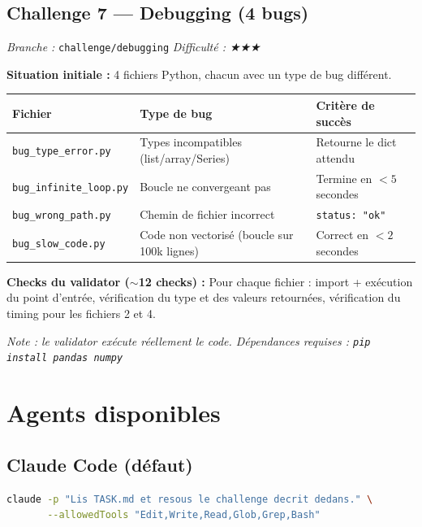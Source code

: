 \documentclass[11pt,a4paper]{article}
\newcommand{\code}[1]{\texttt{#1}}
\begin{document}
\subsection{Challenge 7 — Debugging (4 bugs)}
\textit{Branche :} \code{challenge/debugging} \quad \textit{Difficulté : ★★★}

\textbf{Situation initiale :} 4 fichiers Python, chacun avec un type de bug différent.

\begin{center}
\begin{tabular}{lll}
  \toprule
  Fichier & Type de bug & Critère de succès \\
  \midrule
  \code{bug\_type\_error.py}    & Types incompatibles (list/array/Series) & Retourne le dict attendu \\
  \code{bug\_infinite\_loop.py} & Boucle ne convergeant pas                & Termine en $< 5$ secondes \\
  \code{bug\_wrong\_path.py}    & Chemin de fichier incorrect               & \code{status: "ok"} \\
  \code{bug\_slow\_code.py}     & Code non vectorisé (boucle sur 100k lignes) & Correct en $< 2$ secondes \\
  \bottomrule
\end{tabular}
\end{center}

\textbf{Checks du validator ($\sim$12 checks) :}
Pour chaque fichier : import + exécution du point d'entrée, vérification du
type et des valeurs retournées, vérification du timing pour les fichiers 2 et 4.

\textit{Note : le validator exécute réellement le code.
Dépendances requises : \code{pip install pandas numpy}}

\section{Agents disponibles}

\subsection{Claude Code (défaut)}

\begin{lstlisting}[language=bash]
claude -p "Lis TASK.md et resous le challenge decrit dedans." \
       --allowedTools "Edit,Write,Read,Glob,Grep,Bash"
\end{lstlisting}
\end{document}
